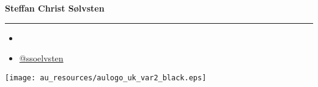 \documentclass[english, aspectratio=169]{beamer}
\begin{document}
\begin{frame}{}

  {\Large \textbf{Steffan Christ Sølvsten}}
  {\hrule width0.5\linewidth}

  \vspace{5pt}
  
  \begin{itemize}
  \item[\faIcon{envelope}] 
  \item[\faIcon{twitter}] \href{https://www.twitter.com/ssoelvsten}{@ssoelvsten}
  \end{itemize}

  \vspace{20pt}

  \texttt{[image: au\_resources/aulogo\_uk\_var2\_black.eps]}
\end{frame}
\end{document}

